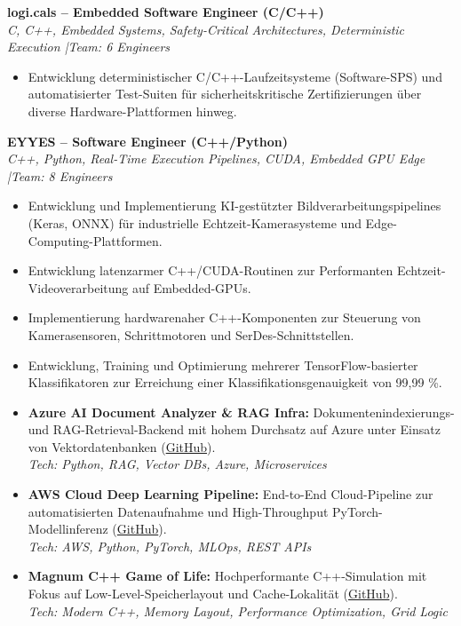 \documentclass[10pt,a4paper]{article}
\begin{document}
\vspace{0.15cm}
\newpage
\textbf{logi.cals -- Embedded Software Engineer (C/C++)} \\
\textit{C, C++, Embedded Systems, Safety-Critical Architectures, Deterministic Execution \quad|\quad Team: 6 Engineers}
\begin{itemize}
    \item Entwicklung deterministischer C/C++-Laufzeitsysteme (Software-SPS) und automatisierter Test-Suiten für sicherheitskritische Zertifizierungen über diverse Hardware-Plattformen hinweg.
\end{itemize}

\vspace{0.15cm}
\textbf{EYYES -- Software Engineer (C++/Python)} \\
\textit{C++, Python, Real-Time Execution Pipelines, CUDA, Embedded GPU Edge \quad|\quad Team: 8 Engineers}
\begin{itemize}
    \item Entwicklung und Implementierung KI-gestützter Bildverarbeitungspipelines (Keras, ONNX) für industrielle Echtzeit-Kamerasysteme und Edge-Computing-Plattformen.
    \item Entwicklung latenzarmer C++/CUDA-Routinen zur Performanten Echtzeit-Videoverarbeitung auf Embedded-GPUs.
    \item Implementierung hardwarenaher C++-Komponenten zur Steuerung von Kamerasensoren, Schrittmotoren und SerDes-Schnittstellen.
    \item Entwicklung, Training und Optimierung mehrerer TensorFlow-basierter Klassifikatoren zur Erreichung einer Klassifikationsgenauigkeit von 99,99 \%.
\end{itemize}


\begin{itemize}[leftmargin=1.5em, itemsep=0.2em]
    \item \textbf{Azure AI Document Analyzer \& RAG Infra:} Dokumentenindexierungs- und RAG-Retrieval-Backend mit hohem Durchsatz auf Azure unter Einsatz von Vektordatenbanken (\href{https://github.com/CodeByMaxx/AI-Document-Analyzer}{GitHub}).\\
    \textit{Tech: Python, RAG, Vector DBs, Azure, Microservices}
    \item \textbf{AWS Cloud Deep Learning Pipeline:} End-to-End Cloud-Pipeline zur automatisierten Datenaufnahme und High-Throughput PyTorch-Modellinferenz (\href{https://github.com/CodeByMaxx/aws-pneumonia-detection}{GitHub}).\\
    \textit{Tech: AWS, Python, PyTorch, MLOps, REST APIs}
    \item \textbf{Magnum C++ Game of Life:} Hochperformante C++-Simulation mit Fokus auf Low-Level-Speicherlayout und Cache-Lokalität (\href{https://github.com/CodeByMaxx/magnum-game-of-life}{GitHub}).\\
    \textit{Tech: Modern C++, Memory Layout, Performance Optimization, Grid Logic}
\end{itemize}
\end{document}
